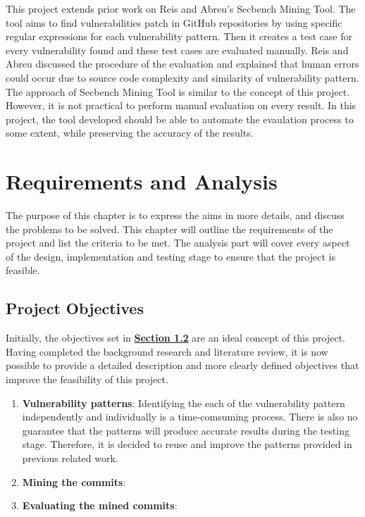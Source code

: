 \documentclass[12pt, a4paper]{report}
\begin{document}
{This project extends prior work on Reis and Abreu's \cite{secbench} Secbench Mining Tool. The tool
aims to find vulnerabilities patch in GitHub repositories by using specific regular expressions for
each vulnerability pattern. Then it creates a test case for every vulnerability found and these test
cases are evaluated manually. Reis and Abreu \cite{reis_2017} discussed the procedure of the
evaluation and explained that human errors could occur due to source code complexity and similarity
of vulnerability pattern. The approach of Secbench Mining Tool is similar to the concept of this
project. However, it is not practical to perform manual evaluation on every result. In this project,
the tool developed should be able to automate the evaulation process to some extent, while
preserving the accuracy of the results.

\chapter{Requirements and Analysis}
The purpose of this chapter is to express the aims in more details, and discuss the problems to be
solved. This chapter will outline the requirements of the project and list the criteria to be met.
The analysis part will cover every aspect of the design, implementation and testing stage to ensure
that the project is feasible.

\section{Project Objectives}
Initially, the objectives set in \hyperref[sec:objectives]{\textbf{Section 1.2}} are an ideal
concept of this project. Having completed the background research and literature review, it is now
possible to provide a detailed description and more clearly defined objectives that improve the
feasibility of this project.

\begin{enumerate}
	\item \textbf{Vulnerability patterns}: Identifying the each of the vulnerability pattern
	independently and individually is a time-comsuming process. There is also no guarantee that the
	patterns will produce accurate results during the testing stage. Therefore, it is decided to reuse
	and improve the patterns provided in previous related work.
	\item \textbf{Mining the commits}:
	\item \textbf{Evaluating the mined commits}:
\end{enumerate}

}
\end{document}
